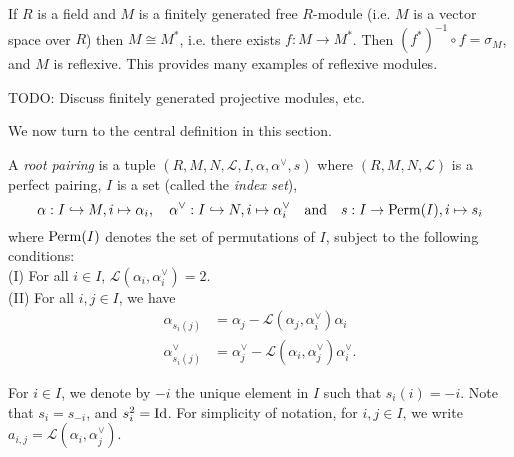 If $R$ is a field and $M$ is a finitely generated free $R$-module (i.e. $M$ is a vector space over $R$) then $M \cong M^*$, i.e. there exists $f : M \to M^*$. Then $(f^*)^{-1} \circ f  = \sigma_M$, and $M$ is reflexive. This provides many examples of reflexive modules. 

TODO: Discuss finitely generated projective modules, etc. 


We now turn to the central definition in this section.
\begin{definition}
    \label{def:root-pairing}
    \leanok
    A {\it root pairing} is a tuple $(R,M,N,\mathcal{L},I,\alpha, \alpha^\vee,s)$ where $(R,M,N,\mathcal{L})$ is a perfect pairing, $I$ is a set (called the {\it index set}),
    \begin{equation}
    \alpha : I \hookrightarrow M, i \mapsto \alpha_i, \quad  \alpha^\vee : I \hookrightarrow N, i \mapsto \alpha_i^\vee \quad \text{and}\quad s : I \to {\rm Perm}(I), i \mapsto s_i
    \end{equation}
    where ${\rm Perm}(I)$ denotes the set of permutations of $I$, subject to the following conditions:\\
       (I) For all $i \in I$, $\mathcal{L}(\alpha_i,\alpha^\vee_i) = 2$. \\
       (II) For all $i,j \in I$, we have
            \begin{align*}
            \alpha_{s_i(j)} &= \alpha_j - \mathcal{L}(\alpha_j,\alpha^\vee_i)\alpha_i \\
            \alpha_{s_i(j)}^\vee &= \alpha_j^\vee - \mathcal{L}(\alpha_i,\alpha^\vee_j)\alpha_i^\vee.
            \end{align*}
\end{definition}
For $i \in I$, we denote by $-i$ the unique element in $I$ such that $s_i(i) = -i$. Note that $s_i = s_{-i}$, and $s_i^2 = {\rm Id}$. For simplicity of notation, for $i,j \in I$, we write $a_{i,j} = \mathcal{L}(\alpha_i,\alpha_j^\vee)$. 


